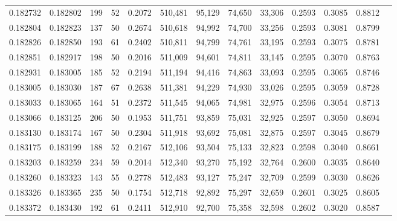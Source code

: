 \begin{tabular}{rrrrrrrrrrrrr}
0.182732 & 0.182802 &   199 &  52 &                                     0.2072 & 510,481 &  95,129 &  74,650 &  33,306 & 0.2593 & 0.3085 & 0.8812 \\
0.182804 & 0.182823 &   137 &  50 &                                     0.2674 & 510,618 &  94,992 &  74,700 &  33,256 & 0.2593 & 0.3081 & 0.8799 \\
0.182826 & 0.182850 &   193 &  61 &                                     0.2402 & 510,811 &  94,799 &  74,761 &  33,195 & 0.2593 & 0.3075 & 0.8781 \\
0.182851 & 0.182917 &   198 &  50 &                                     0.2016 & 511,009 &  94,601 &  74,811 &  33,145 & 0.2595 & 0.3070 & 0.8763 \\
0.182931 & 0.183005 &   185 &  52 &                                     0.2194 & 511,194 &  94,416 &  74,863 &  33,093 & 0.2595 & 0.3065 & 0.8746 \\
0.183005 & 0.183030 &   187 &  67 &                                     0.2638 & 511,381 &  94,229 &  74,930 &  33,026 & 0.2595 & 0.3059 & 0.8728 \\
0.183033 & 0.183065 &   164 &  51 &                                     0.2372 & 511,545 &  94,065 &  74,981 &  32,975 & 0.2596 & 0.3054 & 0.8713 \\
0.183066 & 0.183125 &   206 &  50 &                                     0.1953 & 511,751 &  93,859 &  75,031 &  32,925 & 0.2597 & 0.3050 & 0.8694 \\
0.183130 & 0.183174 &   167 &  50 &                                     0.2304 & 511,918 &  93,692 &  75,081 &  32,875 & 0.2597 & 0.3045 & 0.8679 \\
0.183175 & 0.183199 &   188 &  52 &                                     0.2167 & 512,106 &  93,504 &  75,133 &  32,823 & 0.2598 & 0.3040 & 0.8661 \\
0.183203 & 0.183259 &   234 &  59 &                                     0.2014 & 512,340 &  93,270 &  75,192 &  32,764 & 0.2600 & 0.3035 & 0.8640 \\
0.183260 & 0.183323 &   143 &  55 &                                     0.2778 & 512,483 &  93,127 &  75,247 &  32,709 & 0.2599 & 0.3030 & 0.8626 \\
0.183326 & 0.183365 &   235 &  50 &                                     0.1754 & 512,718 &  92,892 &  75,297 &  32,659 & 0.2601 & 0.3025 & 0.8605 \\
0.183372 & 0.183430 &   192 &  61 &                                     0.2411 & 512,910 &  92,700 &  75,358 &  32,598 & 0.2602 & 0.3020 & 0.8587 \\

\end{tabular}
